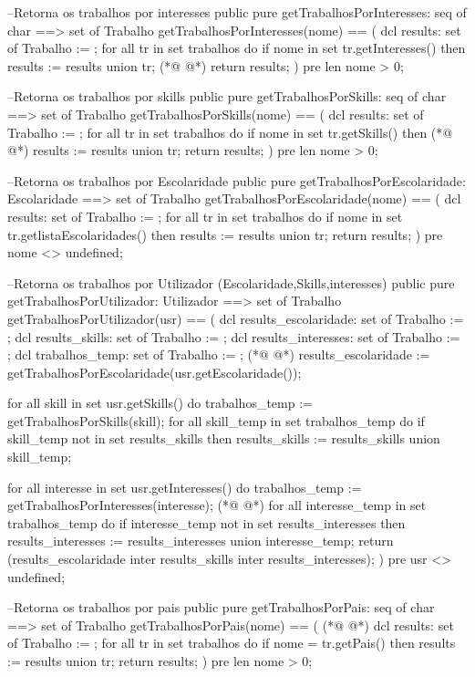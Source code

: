 \begin{vdmpp}[breaklines=true]
 --Retorna os trabalhos por interesses
 public pure getTrabalhosPorInteresses: seq of char ==> set of Trabalho
 getTrabalhosPorInteresses(nome) == (
  dcl results: set of Trabalho := {};
  for all tr in set trabalhos do
   if nome in set tr.getInteresses() then
    results := results union {tr};
(*@
\label{getTrabalhosPorEscolaridade:76}
@*)
  return results;
 )
 pre len nome > 0;
 
 --Retorna os trabalhos por skills
 public pure getTrabalhosPorSkills: seq of char ==> set of Trabalho
 getTrabalhosPorSkills(nome) == (
  dcl results: set of Trabalho := {};
  for all tr in set trabalhos do
   if nome in set tr.getSkills() then
(*@
\label{getTrabalhosPorUtilizador:86}
@*)
    results := results union {tr};
  return results;
 )
 pre len nome > 0;

 --Retorna os trabalhos por Escolaridade
 public pure getTrabalhosPorEscolaridade: Escolaridade ==> set of Trabalho
 getTrabalhosPorEscolaridade(nome) == (
  dcl results: set of Trabalho := {};
  for all tr in set trabalhos do
   if nome in set tr.getlistaEscolaridades() then
    results := results union {tr};
  return results;
 )
 pre nome <> undefined;
 
 --Retorna os trabalhos por Utilizador (Escolaridade,Skills,interesses)
 public pure getTrabalhosPorUtilizador: Utilizador ==> set of Trabalho
 getTrabalhosPorUtilizador(usr) == (
  dcl results_escolaridade: set of Trabalho := {};
  dcl results_skills: set of Trabalho := {};
  dcl results_interesses: set of Trabalho := {};
  dcl trabalhos_temp: set of Trabalho := {};
(*@
\label{getTrabalhosPorPais:109}
@*)
  results_escolaridade := getTrabalhosPorEscolaridade(usr.getEscolaridade());
  
  for all skill in set usr.getSkills() do
   trabalhos_temp := getTrabalhosPorSkills(skill);
   for all skill_temp in set trabalhos_temp do
    if skill_temp not in set results_skills then
     results_skills := results_skills union {skill_temp};
     
  for all interesse in set usr.getInteresses() do
   trabalhos_temp := getTrabalhosPorInteresses(interesse);
(*@
\label{getTrabalhosPorLocalidade:119}
@*)
   for all interesse_temp in set trabalhos_temp do
    if interesse_temp not in set results_interesses then
     results_interesses := results_interesses union {interesse_temp};
  return (results_escolaridade inter results_skills inter results_interesses);
 )
 pre usr <> undefined;
 
 --Retorna os trabalhos por pais
 public pure getTrabalhosPorPais: seq of char ==> set of Trabalho
 getTrabalhosPorPais(nome) == (
(*@
\label{getUtilizadoresPorInteresses:129}
@*)
  dcl results: set of Trabalho := {};
  for all tr in set trabalhos do
   if nome = tr.getPais() then
    results := results union {tr};
  return results;
 )
 pre len nome > 0;
 

\end{vdmpp}
